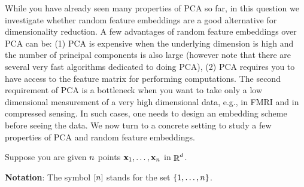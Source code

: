 \documentclass{article}
\DeclareMathOperator{\R}{\mathbb{R}}
\renewcommand{\vec}[1]{\boldsymbol{\mathbf{#1}}}
\begin{document}
While you have already seen many properties of PCA so far, in this question
we investigate whether random feature embeddings are a good alternative for dimensionality
reduction.
A few advantages of random feature embeddings over PCA can be:
(1) PCA is expensive when the underlying dimension is high
and the number of principal components is also large (however note that
there are several very fast algorithms dedicated to doing PCA), 
(2) PCA requires you to have access to the feature matrix for performing
computations. The second requirement of PCA is a bottleneck
when you want to take only a low dimensional measurement of a very
high dimensional data, e.g., in FMRI and in compressed sensing.
In such cases, one needs to design an embedding scheme before seeing the data.
We now turn to a concrete setting to study a few properties of PCA
and random feature embeddings.


Suppose you are given $n$ points $\vec x_1, \ldots, \vec x_\num$ in $\R^\dims$.

{\bf Notation}: The symbol $[n]$ stands for the set $\{1, \ldots, n\}$.
\end{document}
